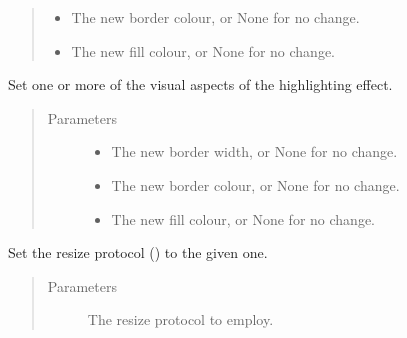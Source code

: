 \documentclass[letterpaper,10pt,english,openany,oneside]{sphinxmanual}
\begin{document}
\begin{fulllineitems}
\begin{fulllineitems}
\begin{quote}
\begin{description}
\begin{itemize}
\item {} 
 \textendash{} The new border colour, or None for no change.

\item {} 
 \textendash{} The new fill colour, or None for no change.

\end{itemize}

\end{description}\end{quote}

\end{fulllineitems}


\begin{fulllineitems}
\label{\detokenize{api:spookyconsole.gui.core.Grid.set_highlight_visual}}
Set one or more of the visual aspects of the highlighting effect.
\begin{quote}\begin{description}
\item[{Parameters}] \leavevmode\begin{itemize}
\item {} 
 \textendash{} The new border width, or None for no change.

\item {} 
 \textendash{} The new border colour, or None for no change.

\item {} 
 \textendash{} The new fill colour, or None for no change.

\end{itemize}

\end{description}\end{quote}

\end{fulllineitems}


\begin{fulllineitems}
\label{\detokenize{api:spookyconsole.gui.core.Grid.set_resize_protocol}}
Set the resize protocol () to the given one.
\begin{quote}\begin{description}
\item[{Parameters}] \leavevmode
{} \textendash{} The resize protocol to employ.


\end{description}
\end{quote}
\end{fulllineitems}
\end{fulllineitems}
\end{document}
